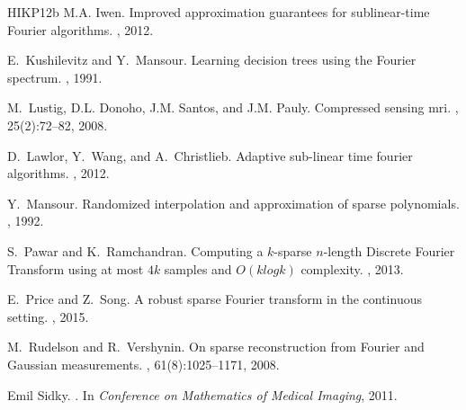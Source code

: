 \documentclass[11pt]{article}
\begin{document}
\begin{thebibliography}{HIKP12b}
M.A. Iwen.
\newblock Improved approximation guarantees for sublinear-time {F}ourier
  algorithms.
, 2012.

E.~Kushilevitz and Y.~Mansour.
\newblock Learning decision trees using the {F}ourier spectrum.
, 1991.

M.~Lustig, D.L. Donoho, J.M. Santos, and J.M. Pauly.
\newblock Compressed sensing mri.
, 25(2):72--82, 2008.

D.~Lawlor, Y.~Wang, and A.~Christlieb.
\newblock Adaptive sub-linear time fourier algorithms.
, 2012.

Y.~Mansour.
\newblock Randomized interpolation and approximation of sparse polynomials.
, 1992.

S.~Pawar and K.~Ramchandran.
\newblock Computing a $k$-sparse $n$-length {D}iscrete {F}ourier {T}ransform
  using at most $4k$ samples and {$O(k log k)$} complexity.
, 2013.

E.~Price and Z.~Song.
\newblock A robust sparse {F}ourier transform in the continuous setting.
, 2015.

M.~Rudelson and R.~Vershynin.
\newblock On sparse reconstruction from {F}ourier and {G}aussian measurements.
, 61(8):1025--1171, 2008.

Emil Sidky.
.
\newblock In {\em Conference on Mathematics of Medical Imaging}, 2011.

\end{thebibliography}


\begin{appendix}

\end{appendix}
\end{document}
